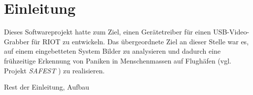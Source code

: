 \section{Einleitung}
Dieses Softwareprojekt hatte zum Ziel, einen Gerätetreiber für einen USB-Video-Grabber für RIOT zu entwickeln.
Das übergeordnete Ziel an dieser Stelle war es, auf einem eingebetteten System Bilder zu analysieren und dadurch eine frühzeitige  Erkennung von Paniken in Menschenmassen auf Flughäfen (vgl. Projekt \emph{SAFEST} \autocite{website:safest}) zu realisieren.

{\huge Rest der Einleitung, Aufbau}